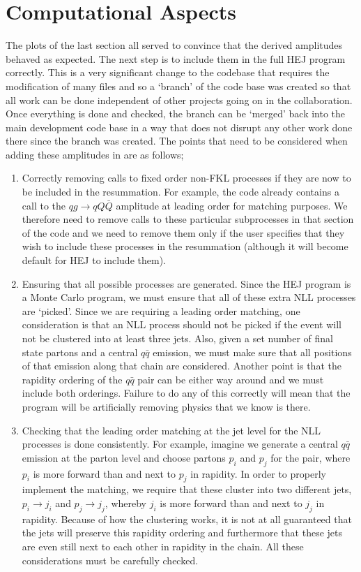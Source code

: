 \section{Computational Aspects}
The plots of the last section all served to convince that the derived amplitudes behaved as expected. The next step is to include them in the full HEJ program correctly. This is a very significant change to the codebase that requires the modification of many files and so a `branch' of the code base was created so that all work can be done independent of other projects going on in the collaboration. Once everything is done and checked, the branch can be `merged' back into the main development code base in a way that does not disrupt any other work done there since the branch was created. The points that need to be considered when adding these amplitudes in are as follows;
\begin{enumerate}
\item{Correctly removing calls to fixed order non-FKL processes if they are now to be included in the resummation. For example, the code already contains a call to the $qg \to qQ\bar{Q}$ amplitude at leading order for matching purposes. We therefore need to remove calls to these particular subprocesses in that section of the code and we need to remove them only if the user specifies that they wish to include these processes in the resummation (although it will become default for HEJ to include them). }
\item{Ensuring that all possible processes are generated. Since the HEJ program is a Monte Carlo program, we must ensure that all of these extra NLL processes are `picked'. Since we are requiring a leading order matching, one consideration is that an NLL process should not be picked if the event will not be clustered into at least three jets. Also, given a set number of final state partons and a central $q\bar{q}$ emission, we must make sure that all positions of that emission along that chain are considered. Another point is that the rapidity ordering of the $q\bar{q}$ pair can be either way around and we must include both orderings. Failure to do any of this correctly will mean that the program will be artificially removing physics that we know is there.}
\item{Checking that the leading order matching at the jet level for the NLL processes is done consistently. For example, imagine we generate a central $q\bar{q}$ emission at the parton level and choose partons $p_i$ and $p_j$ for the pair, where $p_i$ is more forward than and next to $p_j$ in rapidity. In order to properly implement the matching, we require that these cluster into two different jets, $p_i \to j_i$ and $p_j \to j_j$, whereby $j_i$ is more forward than and next to $j_j$ in rapidity. Because of how the clustering works, it is not at all guaranteed that the jets will preserve this rapidity ordering and furthermore that these jets are even still next to each other in rapidity in the chain. All these considerations must be carefully checked. }
\end{enumerate} 
